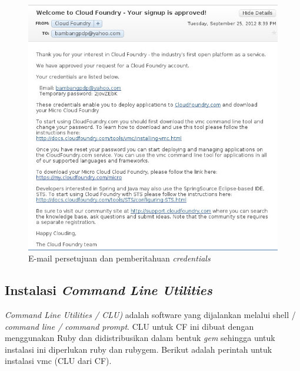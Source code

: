   \begin{figure}[t]
    \begin{center}
      \includegraphics[scale=0.5]{images/cf-signup-approved.jpg}
    \end{center}
    \caption{E-mail persetujuan dan pemberitahuan \textit{credentials}}
    \label{fig:cfsignupapproved}
  \end{figure}

\subsection{Instalasi \textit{Command Line Utilities}}

\textit{Command Line Utilities / CLU)} adalah software yang dijalankan melalui shell / \textit{command line / command prompt}. CLU untuk CF ini dibuat dengan menggunakan Ruby dan didistribusikan dalam bentuk \textit{gem} sehingga untuk instalasi ini diperlukan ruby dan rubygem. Berikut adalah perintah untuk instalasi vmc (CLU dari CF).

